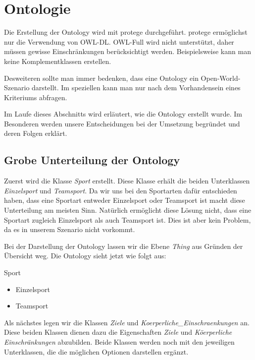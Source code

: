 \section{Ontologie}
Die Erstellung der Ontology wird mit \gls{protege} durchgef\"uhrt. \gls{protege} erm\"oglichst nur die Verwendung von OWL-DL. OWL-Full wird nicht unterst\"utzt, daher m\"ussen gewisse Einschr\"ankungen ber\"ucksichtigt werden. Beispielsweise kann man keine Komplementklassen erstellen. 

Desweiteren sollte man immer bedenken, dass eine Ontology ein Open-World-Szenario darstellt. Im speziellen kann man nur nach dem Vorhandensein eines Kriteriums abfragen.

Im Laufe dieses Abschnitts wird erl\"autert, wie die Ontology erstellt wurde. Im Besonderen werden unsere Entscheidungen bei der Umsetzung begr\"undet und deren Folgen erkl\"art.

\subsection{Grobe Unterteilung der Ontology}
Zuerst wird die Klasse \textit{Sport} erstellt. Diese Klasse erh\"alt die beiden Unterklassen \textit{Einzelsport} und \textit{Teamsport}. Da wir uns bei den Sportarten daf\"ur entschieden haben, dass eine Sportart entweder Einzelsport oder Teamsport ist macht diese Unterteilung am meisten Sinn. Nat\"urlich erm\"oglicht diese L\"osung nicht, dass eine Sportart zugleich Einzelsport als auch Teamsport ist. Dies ist aber kein Problem, da es in unserem Szenario nicht vorkommt.

Bei der Darstellung der Ontology lassen wir die Ebene \textit{Thing} aus Gr\"unden der \"Ubersicht weg.
Die Ontology sieht jetzt wie folgt aus:
\begin{capitemize}
		\item Sport
			\begin{itemize}
				\item Einzelsport
				\item Teamsport
			\end{itemize}
\end{capitemize}

Als n\"achstes legen wir die Klassen \textit{Ziele} und \textit{Koerperliche\_Einschraenkungen} an. Diese beiden Klassen dienen dazu die Eigenschaften \textit{Ziele} und \textit{K\"oerperliche Einschr\"ankungen} abzubilden. Beide Klassen werden noch mit den jeweiligen Unterklassen, die die m\"oglichen Optionen darstellen erg\"anzt.

